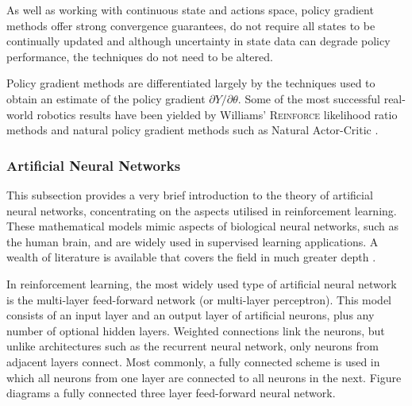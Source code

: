 As well as working with continuous state and actions space, policy gradient
methods offer strong convergence guarantees, do not require all states to be
continually updated and although uncertainty in state data can degrade policy
performance, the techniques do not need to be altered.

Policy gradient methods are differentiated largely by the techniques used to
obtain an estimate of the policy gradient $\partial Y / \partial \theta$.
Some of the most successful real-world robotics results have been yielded by
Williams' \textsc{Reinforce} likelihood ratio methods \cite{williams:reinforce}
and natural policy gradient methods such as Natural Actor-Critic
\cite{peters:enac}.

\subsubsection{Artificial Neural Networks}
This subsection provides a very brief introduction to the theory of artificial
neural networks, concentrating on the aspects utilised in reinforcement
learning.  These mathematical models mimic aspects of biological neural
networks, such as the human brain, and are widely used in supervised learning
applications.  A wealth of literature is available that covers the field
in much greater depth \cite{bishop96ann,fausett94}.

In reinforcement learning, the most widely used type of artificial neural
network is the multi-layer feed-forward network (or multi-layer perceptron).
This model consists of an input layer and an output layer of artificial neurons,
plus any number of optional hidden layers.  Weighted connections link the
neurons, but unlike architectures such as the recurrent neural network, only
neurons from adjacent layers connect.  Most commonly, a fully connected scheme
is used in which all neurons from one layer are connected to all neurons in the
next.  Figure \label{fig:perceptron} diagrams a fully connected three layer
feed-forward neural network.


